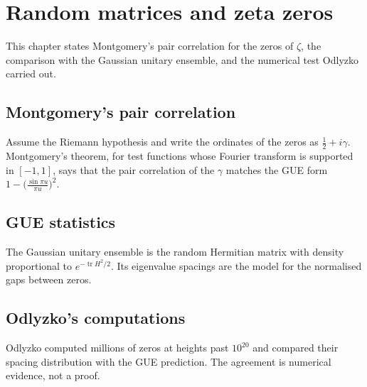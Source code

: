 \chapter{Random matrices and zeta zeros}\label{ch:oc-gue}

This chapter states Montgomery's pair correlation for the zeros of $\zeta$, the comparison with the Gaussian unitary ensemble, and the numerical test Odlyzko carried out.

\section{Montgomery's pair correlation}

Assume the Riemann hypothesis and write the ordinates of the zeros as $\frac12+i\gamma$. Montgomery's theorem, for test functions whose Fourier transform is supported in $[-1,1]$, says that the pair correlation of the $\gamma$ matches the GUE form $1-\bigl(\frac{\sin\pi u}{\pi u}\bigr)^2$.

\section{GUE statistics}

The Gaussian unitary ensemble is the random Hermitian matrix with density proportional to $e^{-\operatorname{tr} H^2/2}$. Its eigenvalue spacings are the model for the normalised gaps between zeros.

\section{Odlyzko's computations}

Odlyzko computed millions of zeros at heights past $10^{20}$ and compared their spacing distribution with the GUE prediction. The agreement is numerical evidence, not a proof.
